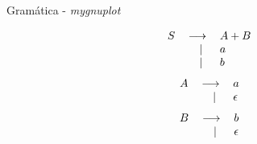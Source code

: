 \documentclass[a4paper,12pt, notitlepage, fleqn]{article}
\newcommand{\va}{\longrightarrow}
\newcommand{\bpr}[1]{\begin{gather*}\begin{tabular}{crl}#1\end{tabular}\end{gather*}}
\newcommand{\lpr}[2]{$#1$ & $\va$ & $#2$\\}
\newcommand{\lpror}[1]{ & $|\ $ & $#1$\\}
\begin{document}
\pagestyle{empty}
\thispagestyle{empty}

\begin{center}
\Large{Gramática - \textit{mygnuplot}}
\end{center}

\bpr{
\lpr{S}{A+B}
\lpror{a}
\lpror{b}
}
\bpr{
\lpr{A}{a}
\lpror{\epsilon}
}
\bpr{
\lpr{B}{b}
\lpror{\epsilon}
}
\end{document}
